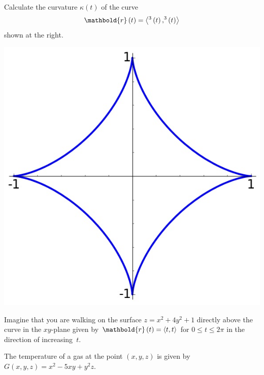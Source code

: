\documentclass[answers,12pt,addpoints]{exam}
\let\cos\relax\DeclareMathOperator{\cos}{\mathsf{cos}}
\let\sin\relax\DeclareMathOperator{\sin}{\mathsf{sin}}
\begin{document}
\begin{questions}
\begin{multicols}{2}
\question[25] Calculate the curvature
$\kappa\left(t\right)$ of the curve
\[\mathbold{r}\left(t\right)
=\left\langle\cos^3\left(t\right),\sin^3\left(t\right)
\right\rangle\]
shown at the right.
\begin{center}\includegraphics[scale=.4]{Astroid}\end{center}
\end{multicols}

\question[25] Imagine that you are walking on the surface
$z=x^2+4y^2+1$ directly above the curve in the
$xy$-plane given by $\mathbold{r}\left(t\right)
=\left\langle\cos{t},\sin{t}\right\rangle$
for $0\le t\le 2\pi$
in the direction of increasing~$t$.

\question[25] The temperature of a gas at the point
$\left(x,y,z\right)$ is given by $G\left(x,y,z\right)
=x^2-5xy+y^2z$.
\begin{parts}

\end{parts}
\end{questions}
\end{document}
